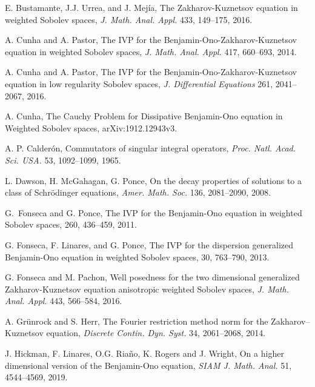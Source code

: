 \documentclass[reqno]{amsart}
\numberwithin{equation}{section}
\begin{document}
%
%
\begin{thebibliography}{99}
 E. Bustamante, J.J. Urrea, and J. Mej\'ia,
The Zakharov-Kuznetsov equation in weighted Sobolev spaces, \textit{J. Math. Anal. Appl.} 433, 149--175, 2016.
	
 A. Cunha and A. Pastor, The IVP for the Benjamin-Ono-Zakharov-Kuznetsov
equation in weighted Sobolev spaces, {\em J. Math. Anal. Appl.} 417, 660--693, 2014.

 A. Cunha and A. Pastor, The IVP for the Benjamin-Ono-Zakharov-Kuznetsov
equation in low regularity Sobolev spaces, \textit{J. Differential Equations} 261, 2041--2067, 2016.

 A. Cunha, The Cauchy Problem for Dissipative Benjamin-Ono equation in Weighted Sobolev spaces, arXiv:1912.12943v3.


A. P. Calder\'on, Commutators of singular integral operators, {\em Proc. Natl. Acad. Sci. USA.} 53, 1092--1099, 1965.



 L. Dawson, H. McGahagan, G. Ponce, On the decay properties
of solutions to a class of {S}chr\"odinger equations, {\em Amer. Math. Soc.}
136, 2081--2090, 2008.




G.~Fonseca and G. Ponce,
\newblock The IVP for the Benjamin-Ono equation in weighted Sobolev spaces,
 260, 436--459, 2011.


G. Fonseca, F. Linares, and G. Ponce,
\newblock The IVP for the dispersion generalized
Benjamin-Ono equation in weighted Sobolev
spaces,
 30, 763--790, 2013.


G. Fonseca and M. Pachon,
\newblock Well posedness for the two dimensional generalized Zakharov-Kuznetsov equation anisotropic weighted Sobolev spaces,
\newblock \textit{J. Math. Anal. Appl.} 443, 566--584, 2016.

 A. Gr\"unrock and S. Herr, The Fourier restriction method norm for the Zakharov–Kuznetsov equation, \textit{Discrete Contin. Dyn. Syst.} 34, 2061--2068, 2014.

 J. Hickman, F. Linares, O.G. Ria\~no, K. Rogers and J. Wright, On a higher dimensional version of the Benjamin-Ono equation, \textit{SIAM J. Math. Anal.} 51, 4544--4569, 2019.



\end{thebibliography}
\end{document}
